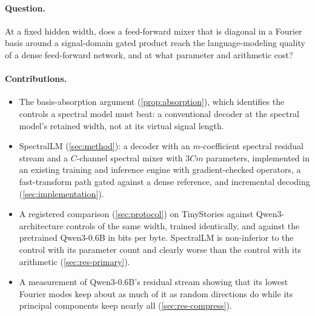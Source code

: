 \paragraph{Question.} At a fixed hidden width, does a feed-forward mixer that
is diagonal in a Fourier basis around a signal-domain gated product reach the
language-modeling quality of a dense feed-forward network, and at what
parameter and arithmetic cost?

\paragraph{Contributions.}
\begin{itemize}
\item The basis-absorption argument (\cref{prop:absorption}), which identifies
  the controls a spectral model must beat: a conventional decoder at the
  spectral model's retained width, not at its virtual signal length.
\item SpectralLM (\cref{sec:method}): a decoder with an $m$-coefficient
  spectral residual stream and a $C$-channel spectral mixer with $3Cm$
  parameters, implemented in an existing training and inference engine with
  gradient-checked operators, a fast-transform path gated against a dense
  reference, and incremental decoding (\cref{sec:implementation}).
\item A registered comparison (\cref{sec:protocol}) on TinyStories against
  Qwen3-architecture controls of the same width, trained identically, and
  against the pretrained Qwen3-0.6B in bits per byte. SpectralLM is
  non-inferior to the control with its parameter count and clearly worse than
  the control with its arithmetic (\cref{sec:res-primary}).
\item A measurement of Qwen3-0.6B's residual stream showing that its lowest
  Fourier modes keep about as much of it as random directions do while its
  principal components keep nearly all (\cref{sec:res-compress}).
\end{itemize}
